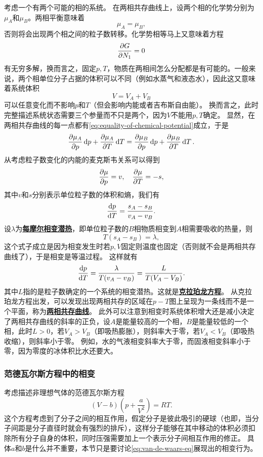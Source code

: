 \documentclass[hyperref, UTF8, a4paper]{ctexart}
\newcommand{\concept}[1]{\underline{\textbf{#1}}}
\begin{document}
考虑一个有两个可能的相的系统。
在两相共存曲线上，设两个相的化学势分别为$\mu_A$和$\mu_B$。两相平衡意味着
\begin{equation}
    \mu_A = \mu_B,
    \label{eq:equality-of-chemical-potential}
\end{equation}
否则将会出现两个相之间的粒子数转移。化学势相等马上又意味着方程
\[
    \pdv{G}{N_1} = 0
\]
有无穷多解，换而言之，固定$p, T$，物质在两相间怎么分配都是有可能的。一般来说，两个相单位分子占据的体积可以不同（例如水蒸气和液态水），因此这又意味着系统体积
\[
    V = V_A + V_B
\]
可以任意变化而不影响$p$和$T$（但会影响内能或者吉布斯自由能）。
换而言之，此时完整描述系统状态需要三个参量而不只是两个，因为$V$不能用$p, T$确定。
显然，在两相共存曲线的每一点都有\eqref{eq:equality-of-chemical-potential}成立，于是
\[
    \pdv{\mu_A}{p} \dd{p} + \pdv{\mu_A}{T} \dd{T} = \pdv{\mu_B}{p} \dd{p} + \pdv{\mu_B}{T} \dd{T}.
\]
从考虑粒子数变化的内能的麦克斯韦关系可以得到
\[
    \pdv{\mu}{p} = v, \quad \pdv{\mu}{T} = -s,
\]
其中$v$和$s$分别表示单位粒子数的体积和熵，我们有
\[
    \dv{p}{T} = \frac{s_A - s_B}{v_A - v_B}.
\]
设$\lambda$为\concept{每摩尔相变潜热}，即单位粒子数的$B$相物质相变到$A$相需要吸收的热量，则
\[
    T(s_A - s_B) = \lambda,
\]
这个式子成立是因为相变发生时若$p, V$固定则温度也固定（否则就不会是两相共存曲线了），于是相变是等温过程。
这样就有
\begin{equation}
    \dv{p}{T} = \frac{\lambda}{T(v_A - v_B)} = \frac{L}{T(V_A - V_B)}.
\end{equation}
其中$L$指的是粒子数确定的一个系统的相变潜热。这就是\concept{克拉珀龙方程}。
从克拉珀龙方程出发，可以发现出现两相共存的区域在$p-T$图上呈现为一条线而不是一个平面，称为\concept{两相共存曲线}。
此外可以注意到相变时系统体积增大还是减小决定了两相共存曲线的斜率的正负，设$A$是能量较高的一个相，$B$是能量较低的一个相，此时$L > 0$，若$V_A > V_B$（即吸热膨胀），则斜率大于零，若$V_A < V_B$（即吸热收缩），则斜率小于零。
例如，水的气液相变斜率大于零，而固液相变斜率小于零，因为零度的冰体积比水还要大。

\subsubsection{范德瓦尔斯方程中的相变}

考虑描述非理想气体的范德瓦尔斯方程
\begin{equation}
    (V-b)(p+\frac{a}{V^2}) = RT.
    \label{eq:van-de-waars-eq}
\end{equation}
这个方程考虑到了分子之间的相互作用，假定分子是彼此吸引的硬球（也即，当分子间距是分子直径时就会有强烈的排斥），这样分子能够在其中移动的体积必须扣除所有分子自身的体积，同时压强需要加上一个表示分子间相互作用的修正。
具体$a$和$b$是什么并不重要，本节只是要讨论\eqref{eq:van-de-waars-eq}展现出的相变行为。
\end{document}
